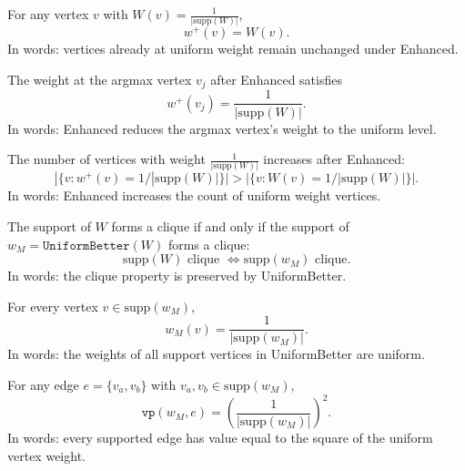 \begin{lemma}
    \label{lem:Enhanced_unaffected}
For any vertex \(v\) with \(W(v) = \frac{1}{|\mathrm{supp}(W)|}\),
\[
w^+(v) = W(v).
\]
In words: vertices already at uniform weight remain unchanged under Enhanced.
\end{lemma}

\begin{lemma}
    \label{lem:Enhanced_effect_argmax}
The weight at the argmax vertex \(v_j\) after Enhanced satisfies
\[
w^+(v_j) = \frac{1}{|\mathrm{supp}(W)|}.
\]
In words: Enhanced reduces the argmax vertex's weight to the uniform level.
\end{lemma}

\begin{lemma}
    \label{lem:Enhanced_inc_uniform_count}
The number of vertices with weight \(\frac{1}{|\mathrm{supp}(W)|}\) increases after Enhanced:
\[
|\{ v : w^+(v) = 1/|\mathrm{supp}(W)| \}| > |\{ v : W(v) = 1/|\mathrm{supp}(W)| \}|.
\]
In words: Enhanced increases the count of uniform weight vertices.
\end{lemma}

\begin{lemma}
    \label{lem:UniformBetter_support_equiv}
    \leanok
The support of \(W\) forms a clique if and only if the support of \(w_M = \texttt{UniformBetter}(W)\) forms a clique:
\[
\mathrm{supp}(W) \text{ clique } \iff \mathrm{supp}(w_M) \text{ clique}.
\]
In words: the clique property is preserved by UniformBetter.
\end{lemma}

\begin{lemma}
  \label{lem:UniformBetter_constant_support}
  \leanok
For every vertex \(v \in \mathrm{supp}(w_M)\),
\[
w_M(v) = \frac{1}{|\mathrm{supp}(w_M)|}.
\]
In words: the weights of all support vertices in UniformBetter are uniform.
\end{lemma}

\begin{lemma}
  \label{lem:UniformBetter_edges_value}
  \leanok
For any edge \(e = \{v_a, v_b\}\) with \(v_a, v_b \in \mathrm{supp}(w_M)\),
\[
\texttt{vp}(w_M, e) = \left(\frac{1}{|\mathrm{supp}(w_M)|}\right)^2.
\]
In words: every supported edge has value equal to the square of the uniform vertex weight.
\end{lemma}

